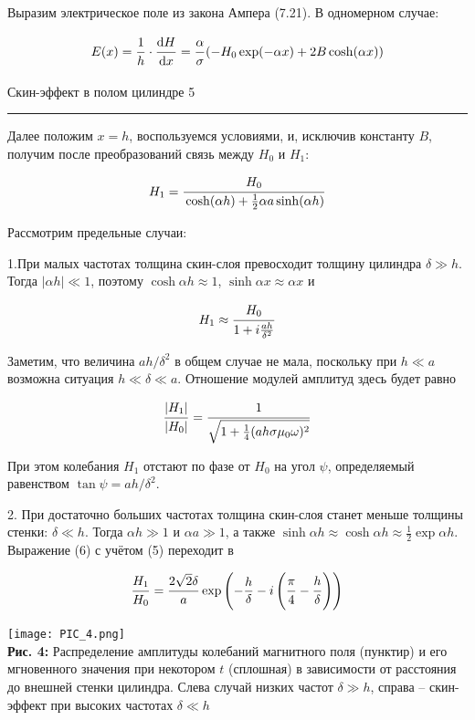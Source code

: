 \documentclass[12pt,a4paper]{scrartcl}
\begin{document}
	Выразим электрическое поле из закона Ампера (7.21). В одномерном случае:
	
	$$E(x) = \dfrac{\strut 1}{\strut h} \cdot \dfrac{\strut \mathrm{d} H}{\strut \mathrm{d} x} = \dfrac{\strut \alpha}{\strut \sigma}(-H_0\exp(-\alpha x) + 2B \cosh(\alpha x))$$
	
	
	\newpage
	
	\begin{flushleft}
		\footnotesize{Скин-эффект в полом цилиндре} \hspace{\fill} \footnotesize{5}
		\\[-0.3cm]\noindent\rule{\textwidth}{0.3pt}
	\end{flushleft}
	
	Далее положим $x = h$, воспользуемся условиями, и, исключив константу $B$, получим после преобразований связь между $H_0$ и $H_1$:
	
	$$H_1 = \dfrac{\strut H_0}{\strut \cosh(\alpha h) + \frac{1}{2}\alpha a \sinh(\alpha h)}$$
	
	Рассмотрим предельные случаи:
	
	1.При малых частотах толщина скин-слоя превосходит толщину цилиндра $\delta \gg h$. Тогда $|\alpha h| \ll 1$, поэтому $\cosh \alpha h \approx 1$, $\sinh \alpha x \approx \alpha x$ и
	
	$$H_1 \approx \dfrac{\strut H_0}{\strut 1 + i\frac{ah}{\delta^2}}$$
	
	Заметим, что величина $ah / \delta^2$ в общем случае не мала, поскольку при	$h \ll a$ возможна ситуация $h \ll \delta \ll a$. Отношение модулей амплитуд здесь будет равно
	
	$$\dfrac{\strut |H_1|}{\strut |H_0|} = \dfrac{\strut 1}{\strut \sqrt{1 + \frac{1}{4} (ah\sigma \mu_0 \omega)^2}}$$
	
	При этом колебания $H_1$ отстают по фазе от $H_0$ на угол $\psi$, определяемый равенством $\tan \psi = ah / \delta^2$.
	
	2. При достаточно больших частотах толщина скин-слоя станет меньше толщины стенки: $\delta \ll h$. Тогда $\alpha h \gg 1$ и $\alpha a \gg 1$, а также $\sinh \alpha h \approx \cosh \alpha h \approx \frac{1}{2} \exp{\alpha h}$. Выражение (6) с учётом (5) переходит в
	
	$$\dfrac{\strut H_1}{\strut H_0} = \dfrac{\strut 2\sqrt{2}\delta}{\strut a} \exp\left(-\frac{h}{\delta} - i\left(\dfrac{\strut \pi}{\strut 4} - \dfrac{\strut h}{\strut \delta}\right)\right)$$
	
	\begin{center}
		\texttt{[image: PIC\_4.png]}
		\\\textbf{Рис. 4:} Распределение амплитуды колебаний магнитного поля (пунктир) и его мгновенного значения при некотором $t$ (сплошная) в зависимости от расстояния до внешней стенки цилиндра. Слева случай низких частот $\delta \gg h$, справа	-- скин-эффект при высоких частотах $\delta \ll h$
	\end{center}
\end{document}
